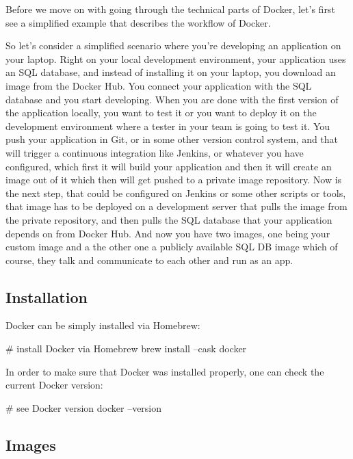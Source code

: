 Before we move on with going through the technical parts of Docker, let's first see a simplified example that
describes the workflow of Docker.

\be
So let's consider a simplified scenario where you're developing an application on your laptop. Right on your local
development environment, your application uses an SQL database, and instead of installing it on your laptop, you
download an image from the Docker Hub. You connect your application with the SQL database and you start developing.
When you are done with the first version of the application locally, you want to test it or you want to deploy it on
the development environment where a tester in your team is going to test it. You push your application in Git, or in
some other version control system, and that will trigger a continuous integration like Jenkins, or whatever you have
configured, which first it will build your application and then it will create an image out of it which then will get
pushed to a private image repository. Now is the next step, that could be configured on Jenkins or some other scripts
or tools, that image has to be deployed on a development server that pulls the image from the private repository, and
then pulls the SQL database that your application depends on from Docker Hub. And now you have two images, one being
your custom image and a the other one a publicly available SQL DB image which of course, they talk and communicate to
each other and run as an app.

\ee

\subsection{Installation}

Docker can be simply installed via Homebrew:

\begin{bash}
# install Docker via Homebrew
brew install --cask docker
\end{bash}

In order to make sure that Docker was installed properly, one can check the current Docker version:

\begin{bash}
# see Docker version
docker --version
\end{bash}

\subsection{Images}

